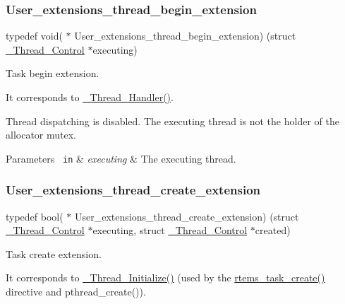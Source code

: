 \subsubsection{\texorpdfstring{User\_extensions\_thread\_begin\_extension}{User\_extensions\_thread\_begin\_extension}}
{\footnotesize\ttfamily typedef void( $\ast$ User\+\_\+extensions\+\_\+thread\+\_\+begin\+\_\+extension) (struct \mbox{\hyperlink{struct__Thread__Control}{\+\_\+\+Thread\+\_\+\+Control}} $\ast$executing)}



Task begin extension. 

It corresponds to \mbox{\hyperlink{group__RTEMSScoreThread_gae0c3a615798c7cc70dc9ff6d9317df46}{\+\_\+\+Thread\+\_\+\+Handler()}}.

Thread dispatching is disabled. The executing thread is not the holder of the allocator mutex.


\begin{DoxyParams}[1]{Parameters}
\mbox{\texttt{ in}}  & {\em executing} & The executing thread. \\
\hline
\end{DoxyParams}
\mbox{\label{group__RTEMSScoreUserExt_gaa1841550f1837f2119ce895ad1b06861}} 
\subsubsection{\texorpdfstring{User\_extensions\_thread\_create\_extension}{User\_extensions\_thread\_create\_extension}}
{\footnotesize\ttfamily typedef bool( $\ast$ User\+\_\+extensions\+\_\+thread\+\_\+create\+\_\+extension) (struct \mbox{\hyperlink{struct__Thread__Control}{\+\_\+\+Thread\+\_\+\+Control}} $\ast$executing, struct \mbox{\hyperlink{struct__Thread__Control}{\+\_\+\+Thread\+\_\+\+Control}} $\ast$created)}



Task create extension. 

It corresponds to \mbox{\hyperlink{group__RTEMSScoreThread_gab4f561fd816d0b93318afa48f609fad2}{\+\_\+\+Thread\+\_\+\+Initialize()}} (used by the \mbox{\hyperlink{group__ClassicTasks_gabffda1c2301962f0ae5af042ac0bba62}{rtems\+\_\+task\+\_\+create()}} directive and pthread\+\_\+create()).

